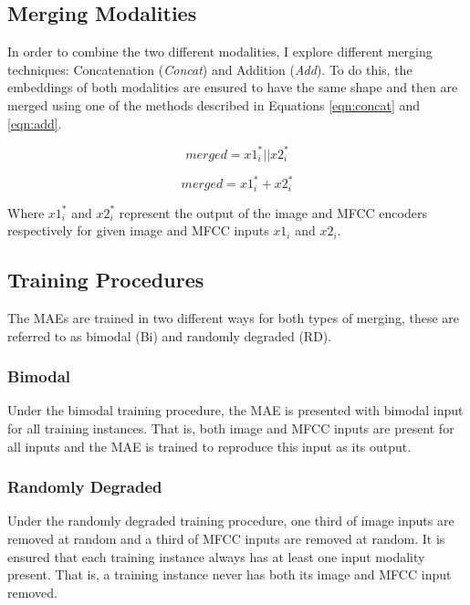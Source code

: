 \subsection{Merging Modalities}
In order to combine the two different modalities, I explore different merging techniques: Concatenation (\textit{Concat}) and Addition (\textit{Add}). To do this, the embeddings of both modalities are ensured to have the same shape and then are merged using one of the methods described in Equations \ref{eqn:concat} and \ref{eqn:add}. %

 \begin{equation}
 	merged = x1^*_i || x2^*_i
 	\label{eqn:concat}
 \end{equation}

 \begin{equation}
 	merged = x1^*_i + x2^*_i
 	\label{eqn:add}  
 \end{equation}
 

Where $x1^*_i$ and $x2^*_i$ represent the output of the image and MFCC encoders respectively for given image and MFCC inputs $x1_i$ and $x2_i$.

\subsection{Training Procedures}

The MAEs are trained in two different ways for both types of merging, these are referred to as bimodal (Bi) and randomly degraded (RD).

\subsubsection{Bimodal}
Under the bimodal training procedure, the MAE is presented with bimodal input for all training instances. That is, both image and MFCC inputs are present for all inputs and the MAE is trained to reproduce this input as its output.

\subsubsection{Randomly Degraded}
Under the randomly degraded training procedure, one third of image inputs are removed at random and a third of MFCC inputs are removed at random. It is ensured that each training instance always has at least one input modality present. That is, a training instance never has both its image and MFCC input removed. 

